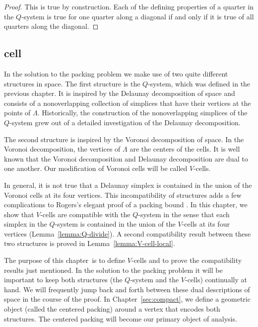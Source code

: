 \begin{proof} This is true by construction.  Each of the defining properties
of a quarter in the $Q$-system is true for one quarter along a
diagonal if and only if  it is true of all quarters along the
diagonal.
\end{proof}







\subsection{cell}
\label{sec:cells} \label{sec:vcells}

In the solution to  the packing problem we make use of two quite
different structures in space.  The first structure is the
$Q$-system, which was defined in the previous chapter.  It is
inspired by the Delaunay decomposition of space and consists of a
nonoverlapping collection of simplices that have their vertices at
the points of $\Lambda$.  Historically, the construction of the
nonoverlapping simplices of the $Q$-system grew out of a detailed
investigation of the Delaunay decomposition.

The second structure is inspired by the Voronoi decomposition of
space. In the Voronoi decomposition, the vertices of $\Lambda$ are
the centers of the cells.  It is well known that the Voronoi
decomposition and Delaunay decomposition are dual to one another.
Our modification of Voronoi cells will be called $V$-cells.

In general, it is not true that a Delaunay simplex is contained in
the union of the Voronoi cells at its four vertices.  This
incompatibility of structures adds a few complications to Rogers's
elegant proof of a packing bound \cite{Rog58}. In this
chapter, we show that $V$-cells are compatible with the $Q$-system
in the sense that each simplex in the  $Q$-system is contained in
the union of the $V$-cells at its four vertices
(Lemma~\ref{lemma:Q-divide}). A second compatibility result
between these two structures is proved in
Lemma~\ref{lemma:V-cell-local}.

The purpose of this chapter\ is to define $V$-cells and to prove the
compatibility results just mentioned.  In the solution to  the 
packing problem it will be important to keep both structures (the
$Q$-system and the $V$-cells) continually at hand. We will
frequently jump back and forth between these dual descriptions of
space in the course of the proof.  In Chapter~\ref{sec:compact}, we
define a geometric object (called the centered packing) around a
vertex that encodes both structures.  The centered packing will
become our primary object of analysis.



